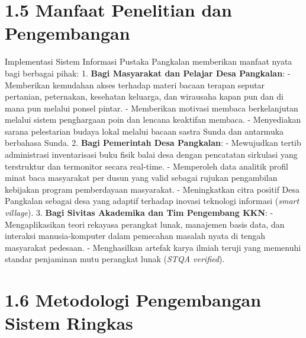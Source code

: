 \documentclass[
  indonesian,
  12pt,
]{report}
\begin{document}
\section{1.5 Manfaat Penelitian dan
Pengembangan}\label{manfaat-penelitian-dan-pengembangan}

Implementasi Sistem Informasi Pustaka Pangkalan memberikan manfaat nyata
bagi berbagai pihak: 1. \textbf{Bagi Masyarakat dan Pelajar Desa
Pangkalan}: - Memberikan kemudahan akses terhadap materi bacaan terapan
seputar pertanian, peternakan, kesehatan keluarga, dan wirausaha kapan
pun dan di mana pun melalui ponsel pintar. - Memberikan motivasi membaca
berkelanjutan melalui sistem penghargaan poin dan lencana keaktifan
membaca. - Menyediakan sarana pelestarian budaya lokal melalui bacaan
sastra Sunda dan antarmuka berbahasa Sunda. 2. \textbf{Bagi Pemerintah
Desa Pangkalan}: - Mewujudkan tertib administrasi inventarisasi buku
fisik balai desa dengan pencatatan sirkulasi yang terstruktur dan
termonitor secara real-time. - Memperoleh data analitik profil minat
baca masyarakat per dusun yang valid sebagai rujukan pengambilan
kebijakan program pemberdayaan masyarakat. - Meningkatkan citra positif
Desa Pangkalan sebagai desa yang adaptif terhadap inovasi teknologi
informasi (\emph{smart village}). 3. \textbf{Bagi Sivitas Akademika dan
Tim Pengembang KKN}: - Mengaplikasikan teori rekayasa perangkat lunak,
manajemen basis data, dan interaksi manusia-komputer dalam pemecahan
masalah nyata di tengah masyarakat pedesaan. - Menghasilkan artefak
karya ilmiah teruji yang memenuhi standar penjaminan mutu perangkat
lunak (\emph{STQA verified}).

\section{1.6 Metodologi Pengembangan Sistem
Ringkas}\label{metodologi-pengembangan-sistem-ringkas}
\end{document}
